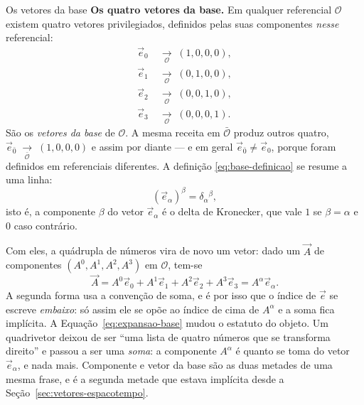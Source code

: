 \documentclass[12pt,a4paper,oneside]{book}
\theoremstyle{rgplain}
\theoremstyle{rgremark}
\newcommand{\obs}{\mathcal{O}}
\newcommand{\obsl}{\bar{\mathcal{O}}}
\newcommand{\temcomp}[1]{\;\underset{#1}{\longrightarrow}\;}
\begin{document}
\begin{interludio}{Os vetores da base}
\textbf{Os quatro vetores da base.} Em qualquer referencial $\obs$ existem
quatro vetores privilegiados, definidos pelas suas componentes \emph{nesse}
referencial:
\begin{equation}
  \begin{aligned}
    \vec e_0 &\temcomp{\obs} (1,0,0,0),\\
    \vec e_1 &\temcomp{\obs} (0,1,0,0),\\
    \vec e_2 &\temcomp{\obs} (0,0,1,0),\\
    \vec e_3 &\temcomp{\obs} (0,0,0,1).
  \end{aligned}
  \label{eq:base-definicao}
\end{equation}
São os \emph{vetores da base} de $\obs$. A mesma receita em $\obsl$ produz
outros quatro, $\vec e_{\bar 0}\temcomp{\obsl}(1,0,0,0)$ e assim por diante --- e
em geral $\vec e_{\bar 0}\neq\vec e_0$, porque foram definidos em referenciais
diferentes. A definição \eqref{eq:base-definicao} se resume a uma linha:
\begin{equation}
  (\vec e_\alpha)^\beta=\delta_\alpha{}^\beta ,
  \label{eq:base-delta}
\end{equation}
isto é, a componente $\beta$ do vetor $\vec e_\alpha$ é o delta de Kronecker,
que vale $1$ se $\beta=\alpha$ e $0$ caso contrário.

Com eles, a quádrupla de números vira de novo um vetor: dado um $\vec A$ de
componentes $(A^0,A^1,A^2,A^3)$ em $\obs$, tem-se
\begin{equation}
  \vec A=A^0\vec e_0+A^1\vec e_1+A^2\vec e_2+A^3\vec e_3
        =A^\alpha\vec e_\alpha .
  \label{eq:expansao-base}
\end{equation}
A segunda forma usa a convenção de soma, e é por isso que o índice de $\vec e$
se escreve \emph{embaixo}: só assim ele se opõe ao índice de cima de $A^\alpha$
e a soma fica implícita. A Equação~\eqref{eq:expansao-base} mudou o estatuto do objeto.
Um quadrivetor deixou de ser ``uma lista de quatro números que se transforma
direito'' e passou a ser uma \emph{soma}: a componente $A^\alpha$ é quanto se
toma do vetor $\vec e_\alpha$, e nada mais. Componente e vetor da base são as
duas metades de uma mesma frase, e é a segunda metade que estava implícita
desde a Seção~\ref{sec:vetores-espacotempo}.


\end{interludio}
\end{document}
